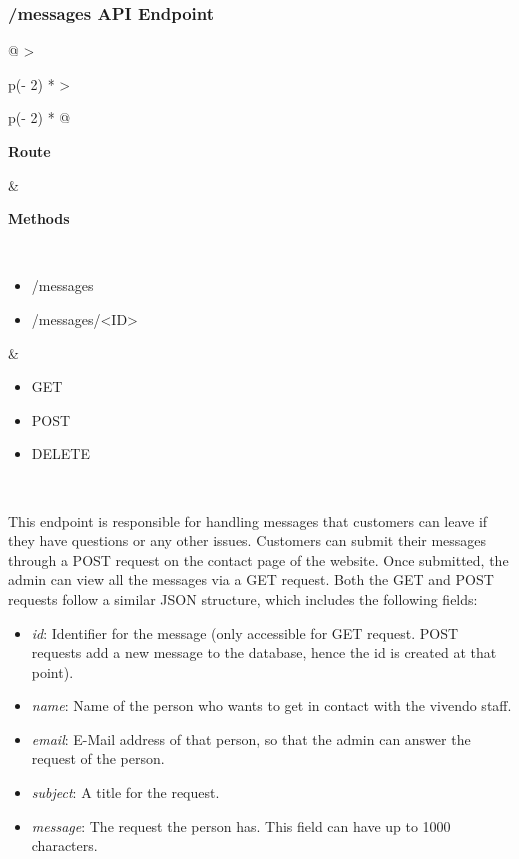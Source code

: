\subsubsection{/messages API Endpoint}

\begin{longtable}[]{@{}
    >{\raggedright\arraybackslash}p{(\columnwidth - 2\tabcolsep) * }
    >{\raggedright\arraybackslash}p{(\columnwidth - 2\tabcolsep) * }@{}}
\toprule
\begin{minipage}[b]{\linewidth}\raggedright
\textbf{Route}
\end{minipage} & \begin{minipage}[b]{\linewidth}\raggedright
\textbf{Methods}
\end{minipage} \\
\midrule
\endhead
\begin{itemize}
    \item /messages
    \item /messages/<ID>
\end{itemize} &
\begin{itemize}
    \item GET
    \item POST
    \item DELETE
\end{itemize} \\
\bottomrule
\end{longtable}

This endpoint is responsible for handling messages that customers can leave if they have questions or any other issues. Customers can submit their messages through a POST request on the contact page of the website. Once submitted, the admin can view all the messages via a GET request. Both the GET and POST requests follow a similar JSON structure, which includes the following fields:

\begin{itemize}
    \item \textit{id}: Identifier for the message (only accessible for GET request. POST requests add a new message to the database, hence the id is created at that point).
    \item \textit{name}: Name of the person who wants to get in contact with the vivendo staff.
    \item \textit{email}: E-Mail address of that person, so that the admin can answer the request of the person.
    \item \textit{subject}: A title for the request.
    \item \textit{message}: The request the person has. This field can have up to 1000 characters.
\end{itemize}

